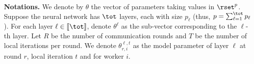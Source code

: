 \documentclass[nohyperref]{article}
\theoremstyle{plain}
\theoremstyle{definition}
\theoremstyle{remark}
\begin{document}
\noindent\textbf{Notations.} We denote by $\theta$ the vector of parameters taking values in $\rset^p$. 
Suppose the neural network has $\tot$ layers, each with size $p_\ell$ (thus, $p= \sum_{\ell=1}^\tot p_\ell$). For each layer $\ell \in \llbracket \tot \rrbracket$, denote $\theta^\ell$ as the sub-vector corresponding to the $\ell$-th layer. Let $R$ be the number of communication rounds and $T$ be the number of local iterations per round. We denote $\theta_{r,i}^{\ell,t}$ as the model parameter of layer $\ell$ at round $r$, local iteration $t$ and for worker $i$.






\end{document}
